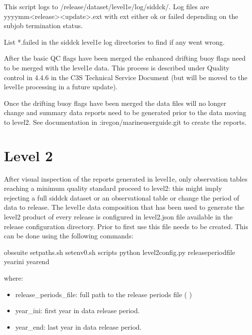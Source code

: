 \documentclass[letterpaper,10pt,english]{sphinxmanual}
\begin{document}
This script logs to /release/dataset/level1e/log/sid\sphinxhyphen{}dck/. Log files
are yyyy\sphinxhyphen{}mm\sphinxhyphen{}\textless{}release\textgreater{}\sphinxhyphen{}\textless{}update\textgreater{}.ext with ext either ok or failed depending on the
subjob termination status.

List  *.failed in the sid\sphinxhyphen{}dck level1e log directories to find if any went wrong.

After the basic QC flags have been merged the enhanced drifting buoy flags need
to be merged with the level1e data. This process is described under Quality
control in 4.4.6 in the C3S Technical Service Document (but will be moved to the level1e
processing in a future update).

Once the drifting buoy flags have been merged the data files will no longer
change and summary data reports need to be generated prior to the data moving to
level2. See documentation in :iregon/marine\sphinxhyphen{}user\sphinxhyphen{}guide.git to
create the reports.


\chapter{Level 2}
\label{\detokenize{index:level-2}}
After visual inspection of the reports generated in level1e, only observation
tables reaching a minimum quality standard proceed to level2: this might imply
rejecting a full sid\sphinxhyphen{}dck dataset or an observational table or change the period
of data to release. The level1e data composition that has been used to generate
the level2 product of every release is configured in level2.json file available
in the release configuration directory. Prior to first use this file needs to be
created. This can be done using the following commands:

\begin{sphinxVerbatim}[commandchars=\\\{\}]
 obs\PYGZhy{}suite
 setpaths.sh
 setenv0.sh
 scripts
python level2\PYGZus{}config.py release\PYGZus{}period\PYGZus{}file year\PYGZus{}ini year\PYGZus{}end
\end{sphinxVerbatim}

where:
\begin{itemize}
\item {} 
release\_periods\_file: full path to the release periods file ( {\hyperref[\detokenize{index:release-periods-file}]{}} )

\item {} 
year\_ini: first year in data release period.

\item {} 
year\_end: last year in data release period.

\end{itemize}
\end{document}
